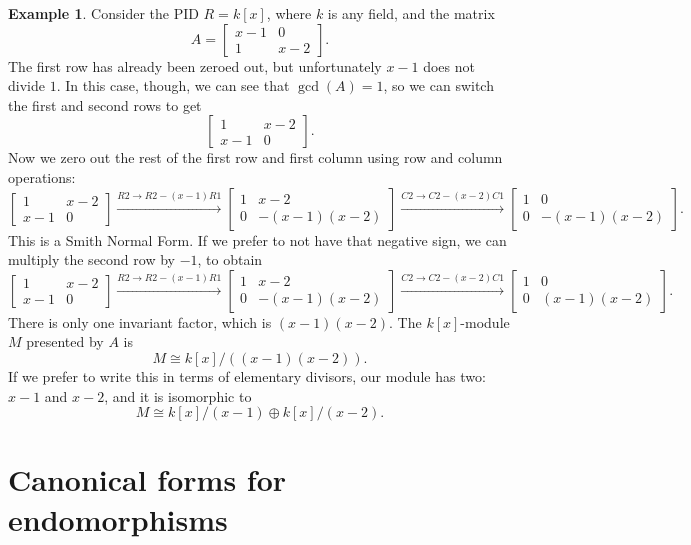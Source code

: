 \documentclass[12pt]{report}
\numberwithin{equation}{section}
\numberwithin{theorem}{chapter}
\theoremstyle{definition}
\newtheorem{example}[theorem]{Example}
\newtheorem*{basic properties}{Basic Properties}
\newtheorem*{Important Remark}{Important Remark}
\begin{document}
\begin{example}
Consider the PID $R = k[x]$, where $k$ is any field, and the matrix
$$A = \begin{bmatrix} x-1 & 0 \\ 1 & x-2 \end{bmatrix}.$$
The first row has already been zeroed out, but unfortunately $x-1$ does not divide $1$. In this case, though, we can see that $\gcd(A) = 1$, so we can switch the first and second rows to get
$$\begin{bmatrix} 1 & x-2 \\ x-1 & 0 \end{bmatrix}.$$
Now we zero out the rest of the first row and first column using row and column operations:
$$\begin{bmatrix} 1 & x-2 \\ x-1 & 0 \end{bmatrix} \xrightarrow{R2 \to R2 - (x-1)R1} \begin{bmatrix} 1 & x-2 \\ 0 & -(x-1)(x-2) \end{bmatrix} \xrightarrow{C2 \to C2 - (x-2)C1} \begin{bmatrix} 1 & 0 \\ 0 & -(x-1)(x-2) \end{bmatrix}.$$
This is a Smith Normal Form. If we prefer to not have that negative sign, we can multiply the second row by $-1$, to obtain
$$\begin{bmatrix} 1 & x-2 \\ x-1 & 0 \end{bmatrix} \xrightarrow{R2 \to R2 - (x-1)R1} \begin{bmatrix} 1 & x-2 \\ 0 & -(x-1)(x-2) \end{bmatrix} \xrightarrow{C2 \to C2 - (x-2)C1} \begin{bmatrix} 1 & 0 \\ 0 & (x-1)(x-2) \end{bmatrix}.$$
There is only one invariant factor, which is $(x-1)(x-2)$. The $k[x]$-module $M$ presented by $A$ is
$$M \cong k[x]/((x-1)(x-2)).$$
If we prefer to write this in terms of elementary divisors, our module has two: $x-1$ and $x-2$, and it is isomorphic to
$$M \cong k[x]/(x-1) \oplus k[x]/(x-2).$$
\end{example}







\chapter{Canonical forms for endomorphisms} 
 
\end{document}
